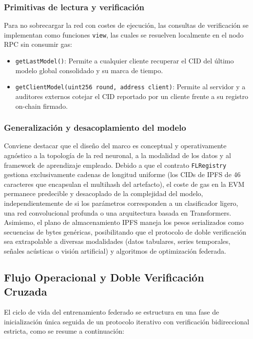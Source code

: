 \subsubsection{Primitivas de lectura y verificación}
Para no sobrecargar la red con costes de ejecución, las consultas de verificación se implementan como funciones \texttt{view}, las cuales se resuelven localmente en el nodo RPC sin consumir gas:
\begin{itemize}
    \item \texttt{getLastModel()}: Permite a cualquier cliente recuperar el CID del último modelo global consolidado y su marca de tiempo.
    \item \texttt{getClientModel(uint256 round, address client)}: Permite al servidor y a auditores externos cotejar el CID reportado por un cliente frente a su registro on-chain firmado.
\end{itemize}

\subsubsection{Generalización y desacoplamiento del modelo}
Conviene destacar que el diseño del marco es conceptual y operativamente agnóstico a la topología de la red neuronal, a la modalidad de los datos y al framework de aprendizaje empleado. Debido a que el contrato \texttt{FLRegistry} gestiona exclusivamente cadenas de longitud uniforme (los CIDs de IPFS de 46 caracteres que encapsulan el multihash del artefacto), el coste de gas en la EVM permanece predecible y desacoplado de la complejidad del modelo, independientemente de si los parámetros corresponden a un clasificador ligero, una red convolucional profunda o una arquitectura basada en Transformers. Asimismo, el plano de almacenamiento IPFS maneja los pesos serializados como secuencias de bytes genéricas, posibilitando que el protocolo de doble verificación sea extrapolable a diversas modalidades (datos tabulares, series temporales, señales acústicas o visión artificial) y algoritmos de optimización federada.

\subsection{Flujo Operacional y Doble Verificación Cruzada}
El ciclo de vida del entrenamiento federado se estructura en una fase de inicialización única seguida de un protocolo iterativo con verificación bidireccional estricta, como se resume a continuación:
\\


